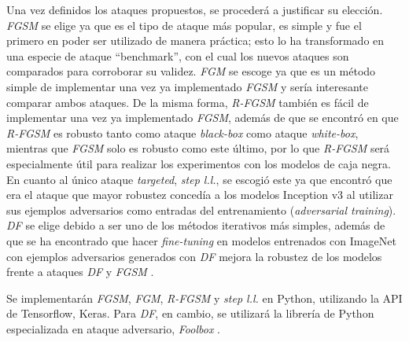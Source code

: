 \documentclass[conference]{IEEEtran}
\begin{document}
Una vez definidos los ataques propuestos, se procederá a justificar su elección. \textit{FGSM} se elige ya que es el tipo de ataque más popular, es simple y fue el primero en poder ser utilizado de manera práctica; esto lo ha transformado en una especie de ataque ``benchmark'', con el cual los nuevos ataques son comparados para corroborar su validez. \textit{FGM} se escoge ya que es un método simple de implementar una vez ya implementado \textit{FGSM} y sería interesante comparar ambos ataques. De la misma forma, \textit{R-FGSM} también es fácil de implementar una vez ya implementado \textit{FGSM}, además de que se encontró en \cite{tramer2017} que \textit{R-FGSM} es robusto tanto como ataque \textit{black-box} como ataque \textit{white-box}, mientras que \textit{FGSM} solo es robusto como este último, por lo que \textit{R-FGSM} será especialmente útil para realizar los experimentos con los modelos de caja negra. En cuanto al único ataque \textit{targeted}, \textit{step l.l.}, se escogió este ya que \cite{kurakin2016} encontró que era el ataque que mayor robustez concedía a los modelos Inception v3 al utilizar sus ejemplos adversarios como entradas del entrenamiento (\textit{adversarial training}). \textit{DF} se elige debido a ser uno de los métodos iterativos más simples, además de que se ha encontrado que hacer \textit{fine-tuning} en modelos entrenados con ImageNet con ejemplos adversarios generados con \textit{DF} mejora la robustez de los modelos frente a ataques \textit{DF} y \textit{FGSM} \cite{deepdefense}.

Se implementarán \textit{FGSM}, \textit{FGM}, \textit{R-FGSM} y \textit{step l.l.} en Python, utilizando la API de Tensorflow, Keras. Para \textit{DF}, en cambio, se utilizará la librería de Python especializada en ataque adversario, \textit{Foolbox} \cite{foolbox}. 
\end{document}
